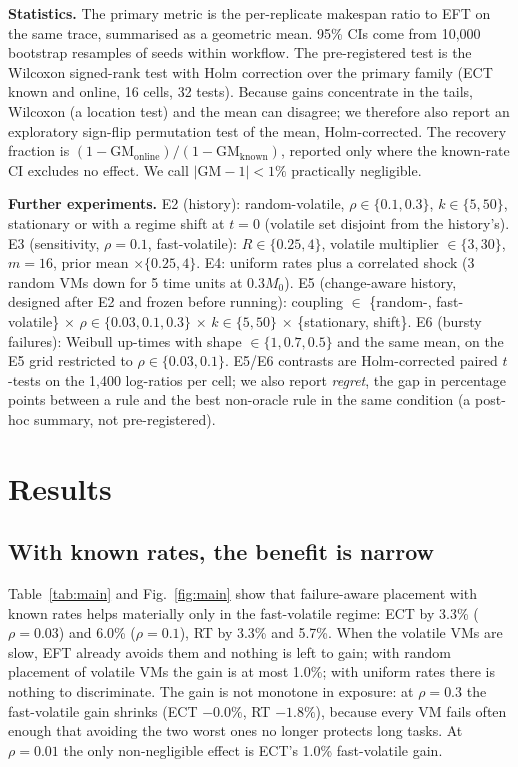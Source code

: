 \documentclass[10pt,twocolumn,letterpaper]{article}
\newcommand{\EFT}{\textsf{EFT}}
\newcommand{\ECT}{\textsf{ECT}}
\newcommand{\RT}{\textsf{RT}}
\begin{document}
\textbf{Statistics.} The primary metric is the per-replicate makespan ratio to \EFT{} on the same trace, summarised
as a geometric mean. 95\% CIs come from 10,000 bootstrap resamples of seeds within workflow. The pre-registered
test is the Wilcoxon signed-rank test with Holm correction over the primary family (\ECT{} known and online,
16 cells, 32 tests). Because gains concentrate in the tails, Wilcoxon (a location test) and the mean can disagree;
we therefore also report an exploratory sign-flip permutation test of the mean, Holm-corrected. The recovery
fraction is $(1-\mathrm{GM}_\text{online})/(1-\mathrm{GM}_\text{known})$, reported only where the known-rate CI
excludes no effect. We call $|\mathrm{GM}-1|<1\%$ practically negligible.

\textbf{Further experiments.} E2 (history): random-volatile, $\rho\in\{0.1,0.3\}$, $k\in\{5,50\}$, stationary or with a
regime shift at $t=0$ (volatile set disjoint from the history's). E3 (sensitivity, $\rho=0.1$, fast-volatile):
$R\in\{0.25,4\}$, volatile multiplier $\in\{3,30\}$, $m=16$, prior mean $\times\{0.25,4\}$. E4: uniform rates plus a
correlated shock (3 random VMs down for 5 time units at $0.3M_0$). E5 (change-aware history, designed after E2 and
frozen before running): coupling $\in$ \{random-, fast-volatile\} $\times$ $\rho\in\{0.03,0.1,0.3\}$ $\times$ $k\in\{5,50\}$
$\times$ \{stationary, shift\}. E6 (bursty failures): Weibull up-times with shape $\in\{1, 0.7, 0.5\}$ and the same mean, on
the E5 grid restricted to $\rho\in\{0.03,0.1\}$. E5/E6 contrasts are Holm-corrected paired $t$-tests on the 1{,}400 log-ratios per
cell; we also report \emph{regret}, the gap in percentage points between a rule and the best non-oracle rule in the same
condition (a post-hoc summary, not pre-registered).

\section{Results}


\subsection{With known rates, the benefit is narrow}
Table~\ref{tab:main} and Fig.~\ref{fig:main} show that failure-aware placement with known rates helps materially
only in the fast-volatile regime: \ECT{} by 3.3\% ($\rho=0.03$) and 6.0\% ($\rho=0.1$), \RT{} by 3.3\% and 5.7\%.
When the volatile VMs are slow, \EFT{} already avoids them and nothing is left to gain; with random placement of
volatile VMs the gain is at most 1.0\%; with uniform rates there is nothing to discriminate. The gain is not
monotone in exposure: at $\rho=0.3$ the fast-volatile gain shrinks (\ECT{} $-0.0\%$, \RT{} $-1.8\%$), because every
VM fails often enough that avoiding the two worst ones no longer protects long tasks. At $\rho=0.01$ the only
non-negligible effect is \ECT{}'s 1.0\% fast-volatile gain.
\end{document}
